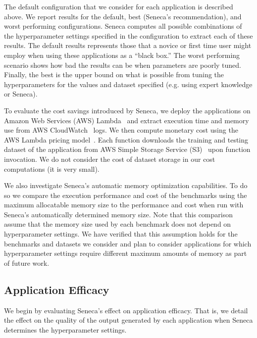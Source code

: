 The default configuration that we consider for each application is described
above.  We report results for the default, best (Seneca's recommendation), and
worst performing configurations.  Seneca computes all possible combinations of
the hyperparameter settings specified in the configuration to extract each of
these results.  The default results represents those that a novice or first
time user might employ when using these applications as a ``black box.''  The
worst performing scenario shows how bad the results can be when parameters are
poorly tuned.  Finally, the best is the upper bound on what is possible from
tuning the hyperparameters for the values and dataset specified 
(e.g. using expert knowledge or Seneca). 

To evaluate the cost savings introduced by Seneca, we deploy the applications
on Amazon Web Services (AWS) Lambda~\cite{ref:awslambda} and extract
execution time and memory use from AWS CloudWatch~\cite{ref:awscloudwatch} logs.  
We then compute monetary cost
using the AWS Lambda pricing model~\cite{ref:pricing}.
Each function downloads the training and testing dataset 
of the application from AWS Simple Storage Service (S3)~\cite{ref:awss3} upon function invocation. 
We do not consider the cost of dataset storage in our cost computations (it is very small).

We also investigate Seneca's automatic memory optimization capabilities.  To
do so we compare the execution performance and cost of the benchmarks using
the maximum allocatable memory size to the performance and cost when run with
Seneca's automatically determined memory size.  Note that this comparison
assume that the memory size used by each benchmark does not depend on
hyperparameter settings.  We have verified that this assumption holds for the
benchmarks and datasets we consider and plan to consider applications for
which hyperparameter settings require different maximum amounts of memory as
part of future work.  

\subsection{Application Efficacy}

We begin by evaluating Seneca's effect on application efficacy.
That is, we detail the effect on the quality of the output generated by each
application when Seneca determines the hyperparameter settings. 

